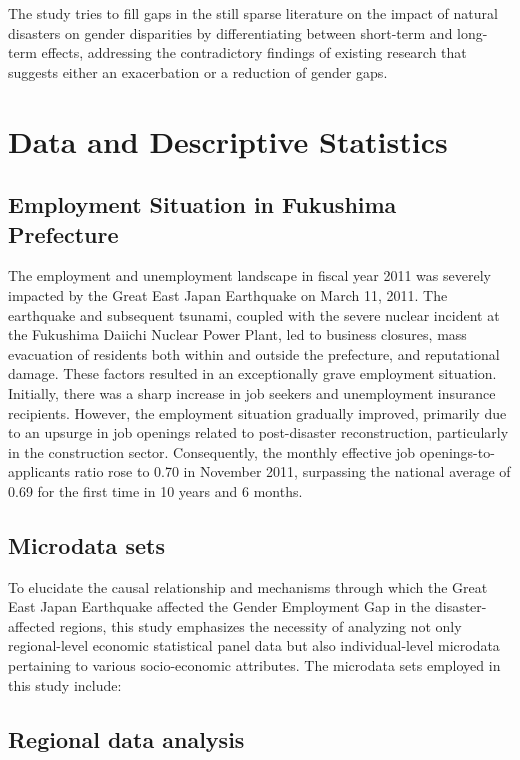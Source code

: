 \documentclass[12pt,halfline,a4paper]{ouparticle}
\begin{document}
The study tries to fill gaps in the still sparse literature on the impact of natural disasters on gender disparities by differentiating between short-term and long-term effects, addressing the contradictory findings of existing research that suggests either an exacerbation or a reduction of gender gaps.


\section{Data and Descriptive Statistics}
\label{sec4}


\subsection{Employment Situation in Fukushima Prefecture}
\label{sec4.1}

The employment and unemployment landscape in fiscal year 2011 was severely impacted by the Great East Japan Earthquake on March 11, 2011. The earthquake and subsequent tsunami, coupled with the severe nuclear incident at the Fukushima Daiichi Nuclear Power Plant, led to business closures, mass evacuation of residents both within and outside the prefecture, and reputational damage. These factors resulted in an exceptionally grave employment situation. Initially, there was a sharp increase in job seekers and unemployment insurance recipients. However, the employment situation gradually improved, primarily due to an upsurge in job openings related to post-disaster reconstruction, particularly in the construction sector. Consequently, the monthly effective job openings-to-applicants ratio rose to 0.70 in November 2011, surpassing the national average of 0.69 for the first time in 10 years and 6 months.


\subsection{Microdata sets}
\label{sec4.1}

To elucidate the causal relationship and mechanisms through which the Great East Japan Earthquake affected the Gender Employment Gap in the disaster-affected regions, this study emphasizes the necessity of analyzing not only regional-level economic statistical panel data but also individual-level microdata pertaining to various socio-economic attributes. The microdata sets employed in this study include:

\subsection{Regional data analysis}
\label{sec4.1}
\end{document}
